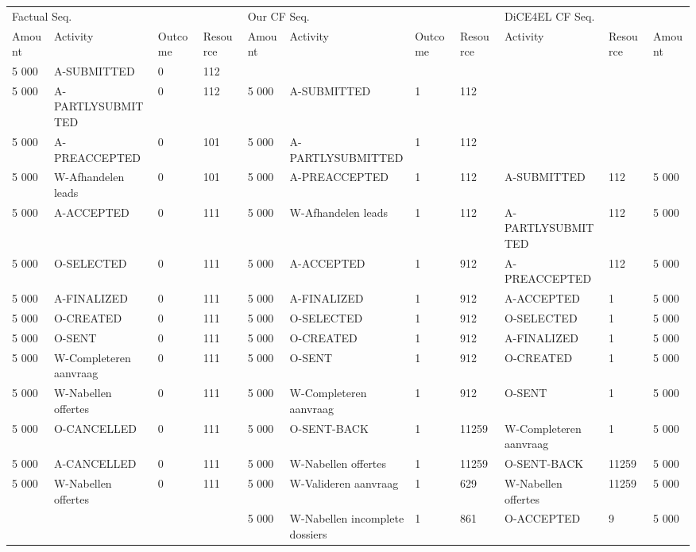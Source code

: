 \begin{tabular}{lllllllllll}
\toprule
\multicolumn{4}{l}{Factual Seq.} & \multicolumn{4}{l}{Our CF Seq.} & \multicolumn{3}{l}{DiCE4EL CF Seq.} \\
Amount & Activity & Outcome & Resource & Amount & Activity & Outcome & Resource & Activity & Resource & Amount \\
\midrule
5 000 & A-SUBMITTED & 0 & 112 &  &  &  &  &  &  &  \\
5 000 & A-PARTLYSUBMITTED & 0 & 112 & 5 000 & A-SUBMITTED & 1 & 112 &  &  &  \\
5 000 & A-PREACCEPTED & 0 & 101 & 5 000 & A-PARTLYSUBMITTED & 1 & 112 &  &  &  \\
5 000 & W-Afhandelen leads & 0 & 101 & 5 000 & A-PREACCEPTED & 1 & 112 & A-SUBMITTED & 112 & 5 000 \\
5 000 & A-ACCEPTED & 0 & 111 & 5 000 & W-Afhandelen leads & 1 & 112 & A-PARTLYSUBMITTED & 112 & 5 000 \\
5 000 & O-SELECTED & 0 & 111 & 5 000 & A-ACCEPTED & 1 & 912 & A-PREACCEPTED & 112 & 5 000 \\
5 000 & A-FINALIZED & 0 & 111 & 5 000 & A-FINALIZED & 1 & 912 & A-ACCEPTED & 1 & 5 000 \\
5 000 & O-CREATED & 0 & 111 & 5 000 & O-SELECTED & 1 & 912 & O-SELECTED & 1 & 5 000 \\
5 000 & O-SENT & 0 & 111 & 5 000 & O-CREATED & 1 & 912 & A-FINALIZED & 1 & 5 000 \\
5 000 & W-Completeren aanvraag & 0 & 111 & 5 000 & O-SENT & 1 & 912 & O-CREATED & 1 & 5 000 \\
5 000 & W-Nabellen offertes & 0 & 111 & 5 000 & W-Completeren aanvraag & 1 & 912 & O-SENT & 1 & 5 000 \\
5 000 & O-CANCELLED & 0 & 111 & 5 000 & O-SENT-BACK & 1 & 11259 & W-Completeren aanvraag & 1 & 5 000 \\
5 000 & A-CANCELLED & 0 & 111 & 5 000 & W-Nabellen offertes & 1 & 11259 & O-SENT-BACK & 11259 & 5 000 \\
5 000 & W-Nabellen offertes & 0 & 111 & 5 000 & W-Valideren aanvraag & 1 & 629 & W-Nabellen offertes & 11259 & 5 000 \\
 &  &  &  & 5 000 & W-Nabellen incomplete dossiers & 1 & 861 & O-ACCEPTED & 9 & 5 000 \\
\bottomrule
\end{tabular}

